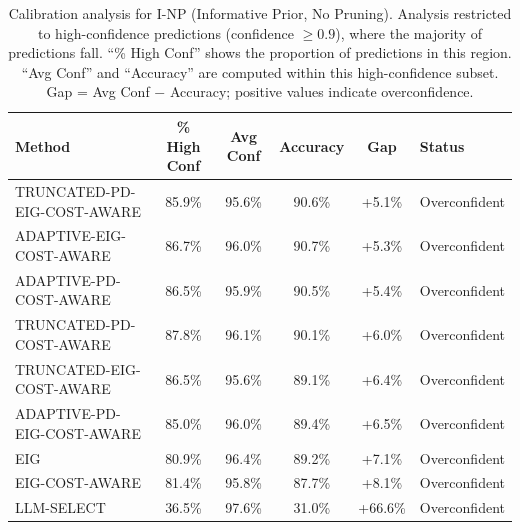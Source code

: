 \begin{table}[htbp]
\centering
\small
\caption{Calibration analysis for I-NP (Informative Prior, No Pruning). Analysis restricted to high-confidence predictions (confidence $\geq 0.9$), where the majority of predictions fall. ``\% High Conf'' shows the proportion of predictions in this region. ``Avg Conf'' and ``Accuracy'' are computed within this high-confidence subset. Gap = Avg Conf $-$ Accuracy; positive values indicate overconfidence.}
\label{tab:calibration-notprune_notuniform}
\begin{tabular}{@{}lccccl@{}}
\toprule
Method & \% High Conf & Avg Conf & Accuracy & Gap & Status \\
\midrule
TRUNCATED-PD-EIG-COST-AWARE & 85.9\% & 95.6\% & 90.6\% & +5.1\% & Overconfident \\
ADAPTIVE-EIG-COST-AWARE & 86.7\% & 96.0\% & 90.7\% & +5.3\% & Overconfident \\
ADAPTIVE-PD-COST-AWARE & 86.5\% & 95.9\% & 90.5\% & +5.4\% & Overconfident \\
TRUNCATED-PD-COST-AWARE & 87.8\% & 96.1\% & 90.1\% & +6.0\% & Overconfident \\
TRUNCATED-EIG-COST-AWARE & 86.5\% & 95.6\% & 89.1\% & +6.4\% & Overconfident \\
ADAPTIVE-PD-EIG-COST-AWARE & 85.0\% & 96.0\% & 89.4\% & +6.5\% & Overconfident \\
EIG & 80.9\% & 96.4\% & 89.2\% & +7.1\% & Overconfident \\
EIG-COST-AWARE & 81.4\% & 95.8\% & 87.7\% & +8.1\% & Overconfident \\
LLM-SELECT & 36.5\% & 97.6\% & 31.0\% & +66.6\% & Overconfident \\
\bottomrule
\end{tabular}
\end{table}